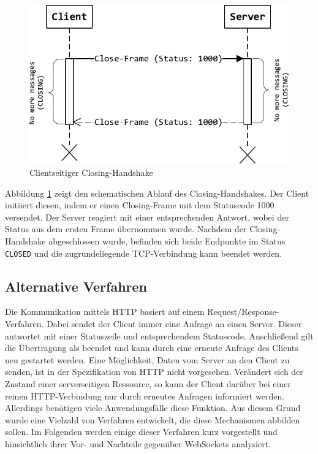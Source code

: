 \documentclass[11pt,a4paper,titlepage]{scrartcl}
\numberwithin{equation}{section}
\begin{document}
\begin{figure}[ht] 
	\begin{center}
		\includegraphics[scale=1]{img/closehandshake.pdf}
		\caption{Clientseitiger Closing-Handshake}
		\label{fig:wsClosingHandshake}
	\end{center}
\end{figure}

\noindent Abbildung \ref{fig:wsClosingHandshake} zeigt den schematischen Ablauf des Closing-Handshakes. Der Client initiiert diesen, indem er einen Closing-Frame mit dem Statuscode 1000 versendet. Der Server reagiert mit einer entsprechenden Antwort, wobei der Status aus dem ersten Frame übernommen wurde. Nachdem der Closing-Handshake abgeschlossen wurde, befinden sich beide Endpunkte im Status \texttt{CLOSED} und die zugrundeliegende TCP-Verbindung kann beendet werden.

\subsection{Alternative Verfahren}\label{subsubsec:AlternativeVerfahren}
Die Kommunikation mittels HTTP basiert auf einem Request/Response-Verfahren. Dabei sendet der Client immer eine Anfrage an einen Server. Dieser antwortet mit einer Statuszeile und entsprechendem Statuscode. Anschließend gilt die Übertragung als beendet und kann durch eine erneute Anfrage des Clients neu gestartet werden. Eine Möglichkeit, Daten vom Server an den Client zu senden, ist in der Spezifikation von HTTP nicht vorgesehen. Verändert sich der Zustand einer serverseitigen Ressource, so kann der Client darüber bei einer reinen HTTP-Verbindung nur durch erneutes Anfragen informiert werden. Allerdings benötigen viele Anwendungsfälle diese Funktion. Aus diesem Grund wurde eine Vielzahl von Verfahren entwickelt, die diese Mechanismen abbilden sollen. Im Folgenden werden einige dieser Verfahren kurz vorgestellt und hinsichtlich ihrer Vor- und Nachteile gegenüber WebSockets analysiert.\\
\end{document}
